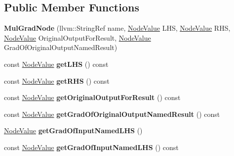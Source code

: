\subsection*{Public Member Functions}
\begin{DoxyCompactItemize}
\item 
\mbox{\label{classglow_1_1_mul_grad_node_a21d79803a0c87ff3be002dc8b8a05925}} 
{\bfseries Mul\+Grad\+Node} (llvm\+::\+String\+Ref name, \hyperlink{structglow_1_1_node_value}{Node\+Value} L\+HS, \hyperlink{structglow_1_1_node_value}{Node\+Value} R\+HS, \hyperlink{structglow_1_1_node_value}{Node\+Value} Original\+Output\+For\+Result, \hyperlink{structglow_1_1_node_value}{Node\+Value} Grad\+Of\+Original\+Output\+Named\+Result)
\item 
\mbox{\label{classglow_1_1_mul_grad_node_aeab23983b11633cb5e13f48c8cdc73da}} 
const \hyperlink{structglow_1_1_node_value}{Node\+Value} {\bfseries get\+L\+HS} () const
\item 
\mbox{\label{classglow_1_1_mul_grad_node_adca0c09ae44bd63c9af104f113121358}} 
const \hyperlink{structglow_1_1_node_value}{Node\+Value} {\bfseries get\+R\+HS} () const
\item 
\mbox{\label{classglow_1_1_mul_grad_node_adab5238e4376521ab56866bd852b17f9}} 
const \hyperlink{structglow_1_1_node_value}{Node\+Value} {\bfseries get\+Original\+Output\+For\+Result} () const
\item 
\mbox{\label{classglow_1_1_mul_grad_node_a034dc43b59af329b4c7cc7730da4c0e5}} 
const \hyperlink{structglow_1_1_node_value}{Node\+Value} {\bfseries get\+Grad\+Of\+Original\+Output\+Named\+Result} () const
\item 
\mbox{\label{classglow_1_1_mul_grad_node_ac8742f794b1f3d1e6d8b19dd42773dfb}} 
\hyperlink{structglow_1_1_node_value}{Node\+Value} {\bfseries get\+Grad\+Of\+Input\+Named\+L\+HS} ()
\item 
\mbox{\label{classglow_1_1_mul_grad_node_a2bc8ee4482a5b622aca328d18648ce30}} 
const \hyperlink{structglow_1_1_node_value}{Node\+Value} {\bfseries get\+Grad\+Of\+Input\+Named\+L\+HS} () const

\end{DoxyCompactItemize}

